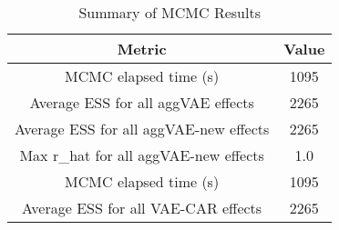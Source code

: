 
\begin{table}[h!]
\centering
\begin{tabular}{|c|c|}
\hline
\textbf{Metric} & \textbf{Value} \\
\hline
MCMC elapsed time (s) & 1095 \\
\hline
Average ESS for all aggVAE effects & 2265 \\
\hline
Average ESS for all aggVAE-new effects & 2265 \\
\hline
Max r\_hat for all aggVAE-new effects & 1.0 \\
\hline
MCMC elapsed time (s) & 1095 \\
\hline
Average ESS for all VAE-CAR effects & 2265 \\
\hline
\end{tabular}
\caption{Summary of MCMC Results}
\label{table:mcmc_summary}
\end{table}

